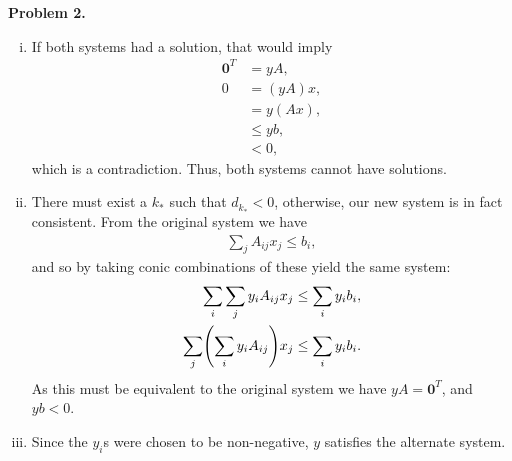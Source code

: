 \documentclass[11pt,a4paper]{article}
\let\originalleft\left
\let\originalright\right
\renewcommand{\left}{\mathopen{}\mathclose\bgroup\originalleft}
\renewcommand{\right}{\aftergroup\egroup\originalright}
\begin{document}
\textbf{Problem 2.}
\begin{enumerate}[i)]
	\item
	If both systems had a solution, that would imply
	\begin{align*}
		\mathbf{0}^T &= yA, \\
		0 &= (y A) x, \\
		&= y (A x), \\
		&\leq yb, \\
		&< 0,
	\end{align*}
	which is a contradiction. Thus, both systems cannot have solutions.
	\item There must exist a $k_*$ such that $d_{k_*} < 0$, otherwise, our new system is in fact consistent. From the original system we have
	\begin{align*}
		\sum_j A_{ij} x_j \leq b_i,
	\end{align*}
	and so by taking conic combinations of these yield the same system:
	\begin{align*}
		\sum_i \sum_j  y_i A_{ij} x_j &\leq \sum_i y_i b_i, \\
		\sum_j \left( \sum_i  y_i A_{ij} \right) x_j &\leq \sum_i y_i b_i.
	\end{align*}
	As this must be equivalent to the original system we have $yA = \mathbf{0}^T$, and $yb < 0$.
	\item Since the $y_i$s were chosen to be non-negative, $y$ satisfies the alternate system.
\end{enumerate}
\end{document}
